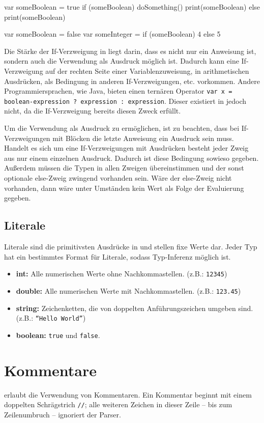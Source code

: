 \begin{ToyaCode}[numbers=none, caption={If-Verzweigung als klassische Anweisung.}, label=lst:intro_ifexpanded]
var someBoolean = true
if (someBoolean) {
    doSomething()
    print(someBoolean)
} else {
    print(someBoolean)
}
\end{ToyaCode}

\begin{ToyaCode}[numbers=none, caption={If-Verzweigung als Ausdruck in einer Variablenzuweisung.}, label=lst:intro_ifexpression]
var someBoolean = false
var someInteger = if (someBoolean) 4 else 5
\end{ToyaCode}

Die Stärke der If-Verzweigung in \toya liegt darin, dass es nicht nur ein Anweisung ist, sondern auch die Verwendung als Ausdruck möglich ist. Dadurch kann eine If-Verzweigung auf der rechten Seite einer Variablenzuweisung, in arithmetischen Ausdrücken, als Bedingung in anderen If-Verzweigungen, etc. vorkommen. Andere Programmiersprachen, wie Java, bieten einen ternären Operator \texttt{var x = boolean-expression ? expression : expression}. Dieser existiert in \toya jedoch nicht, da die If-Verzweigung bereits diesen Zweck erfüllt. 


Um die Verwendung als Ausdruck zu ermöglichen, ist zu beachten, dass bei If-Verzweigungen mit Blöcken die letzte Anweisung ein Ausdruck sein muss. Handelt es sich um eine If-Verzweigungen mit Ausdrücken besteht jeder Zweig aus nur einem einzelnen Ausdruck. Dadurch ist diese Bedingung sowieso gegeben. Außerdem müssen die Typen in allen Zweigen übereinstimmen und der sonst optionale else-Zweig zwingend vorhanden sein. Wäre der else-Zweig nicht vorhanden, dann wäre unter Umständen kein Wert als Folge der Evaluierung gegeben.

\subsection{Literale}

Literale sind die primitivsten Ausdrücke in \toya und stellen fixe Werte dar. Jeder Typ hat ein bestimmtes Format für Literale, sodass Typ-Inferenz möglich ist. 

\begin{itemize}
    \item \textbf{int:} Alle numerischen Werte ohne Nachkommastellen. (z.B.: \texttt{12345})
    \item \textbf{double:} Alle numerischen Werte mit Nachkommastellen. (z.B.: \texttt{123.45})
    \item \textbf{string:} Zeichenketten, die von doppelten Anführungszeichen umgeben sind. (z.B.: \texttt{``Hello World''})
    \item \textbf{boolean:} \texttt{true} und \texttt{false}. 
\end{itemize}

\section{Kommentare}

\toya erlaubt die Verwendung von Kommentaren. Ein Kommentar beginnt mit einem doppelten Schrägstrich \texttt{//}; alle weiteren Zeichen in dieser Zeile -- bis zum Zeilenumbruch -- ignoriert der Parser.